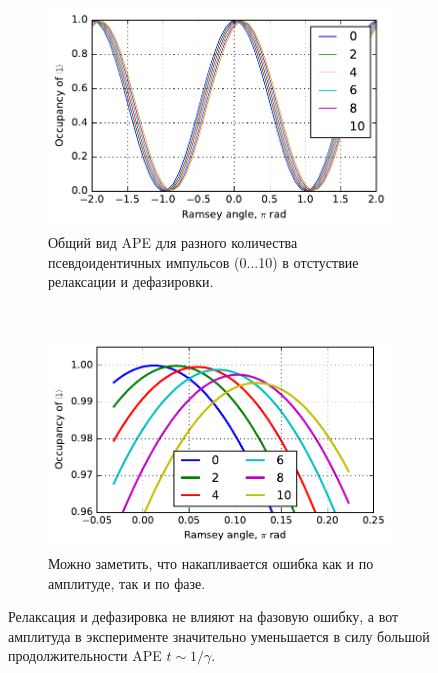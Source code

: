 \documentclass[12pt, twoside]{report}
\numberwithin{equation}{section}
\numberwithin{figure}{section}
\begin{document}
\begin{figure}[!h]
\begingroup
\captionsetup[subfigure]{width=0.95\textwidth, justification=normal}
\centering
\begin{subfigure}[t]{0.49\linewidth}
\centering
\includegraphics[width = .95\textwidth]{Pictures2/APE_result_1}
\caption{ Общий вид APE для разного количества псевдоидентичных импульсов (0...10) в отстуствие релаксации и дефазировки. }
\label{fig:ape-result-1}
\end{subfigure}~
\begin{subfigure}[t]{0.49\linewidth}
\centering
\includegraphics[width = .95\textwidth]{Pictures2/APE_result_2}
\caption{ Можно заметить, что накапливается ошибка как и по амплитуде, так и по фазе. }
\label{fig:ape-result-2}
\end{subfigure}
\endgroup
\caption{ Релаксация и дефазировка не влияют на фазовую ошибку, а вот амплитуда в эксперименте значительно уменьшается в силу большой продолжительности APE $t \sim 1/\gamma$. }
\label{fig:ape-results}
\end{figure} 
\end{document}
